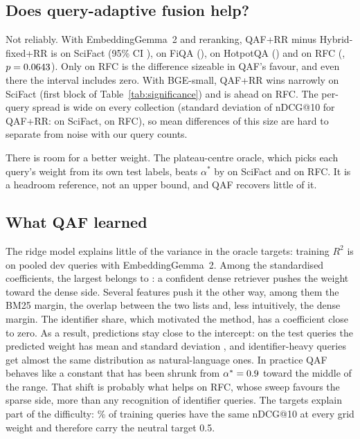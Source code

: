 \subsection{Does query-adaptive fusion help?}
Not reliably. With EmbeddingGemma~2 and reranking, QAF+RR minus
Hybrid-fixed+RR is \QAFgainSciFact{} on SciFact (95\% CI
\QAFgainCISciFact), \QAFgainFiQA{} on FiQA (\QAFgainCIFiQA), \QAFgainHotpot{}
on HotpotQA (\QAFgainCIHotpot) and \QAFgainRFC{} on RFC (\QAFgainCIRFC,
$p=0.0643$). Only on RFC is the difference sizeable in QAF's favour, and even there the
interval includes zero. With BGE-small, QAF+RR wins narrowly on SciFact
(first block of Table~\ref{tab:significance}) and is ahead on RFC. The
per-query spread is wide on every
collection (standard deviation of nDCG@10 for QAF+RR: \NDCGsdSciFact{} on
SciFact, \NDCGsdRFC{} on RFC), so mean differences of this size are hard to
separate from noise with our query counts.

There is room for a better weight. The plateau-centre oracle, which picks
each query's weight from its own test labels, beats $\alpha^{*}$ by
\OracleHeadroomSciFact{} on SciFact and \OracleHeadroomRFC{} on RFC. It is
a headroom reference, not an upper bound, and QAF recovers little of it.

\subsection{What QAF learned}
The ridge model explains little of the variance in the oracle targets:
training $R^2$ is \QAFtrainRsq{} on \QAFnDev{} pooled dev queries with
EmbeddingGemma~2. Among the standardised coefficients, the largest
belongs to \QAFtopFeature: a confident dense retriever pushes the weight
toward the dense side. Several features push it the other way, among them the
BM25 margin, the overlap between the two lists and, less intuitively, the
dense margin. The identifier share, which motivated the method,
has a coefficient close to zero. As a result, predictions stay close to the
intercept: on the test queries the predicted weight has mean \QAFpredMean{}
and standard deviation \QAFpredSd{}, and identifier-heavy queries get almost
the same distribution as natural-language ones. In practice QAF behaves like a
constant that has been shrunk from $\alpha^{*}=0.9$ toward the
middle of the range. That shift is probably what helps on RFC, whose sweep
favours the sparse side, more than any recognition of identifier queries.
The targets explain part of the difficulty: \QAFinsensitivePct\% of training queries
have the same nDCG@10 at every grid weight and therefore carry the neutral
target 0.5.

